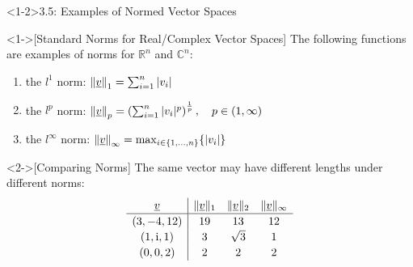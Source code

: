 \documentclass[10pt,english,aspectratio=169]{beamer}
\begin{document}
\begin{frame}<1-2>{3.5: Examples of Normed Vector Spaces}

\begin{example}<1->[Standard Norms for Real/Complex Vector Spaces]
The following functions are examples of norms for $\mathbb{R}^n$ and $\mathbb{C}^n$:
\begin{enumerate}
\item the $l^1$ norm: $\left\| \underline{v} \right\|_1 = \sum_{i=1}^n |v_i|$
\item the $l^p$ norm: $\left\| \underline{v} \right\|_p = \left( \sum_{i=1}^n |v_i|^p \right)^{\frac{1}{p}}, \quad p \in (1,\infty)$
\item the $l^{\infty}$ norm: $\left\| \underline{v} \right\|_{\infty} = \max_{i\in \{1,\ldots, n\}} \{ |v_i| \}$
\end{enumerate}
\end{example}

\vspace{2mm}

\begin{example}<2->[Comparing Norms]
The same vector may have different lengths under different norms:
\[
\renewcommand{\arraystretch}{1.15}
\begin{array}{c|ccc}
\vecnot{v} & \|\vecnot{v}\|_1 & \|\vecnot{v}\|_2 & \|\vecnot{v}\|_\infty \\ \hline
(3,-4,12) & 19 & 13 & 12 \\
(1,\mathrm{i},1) & 3 & \sqrt{3} & 1 \\
(0,0,2) & 2 & 2 & 2
\end{array}
\]
\end{example}


\end{frame}
\end{document}
